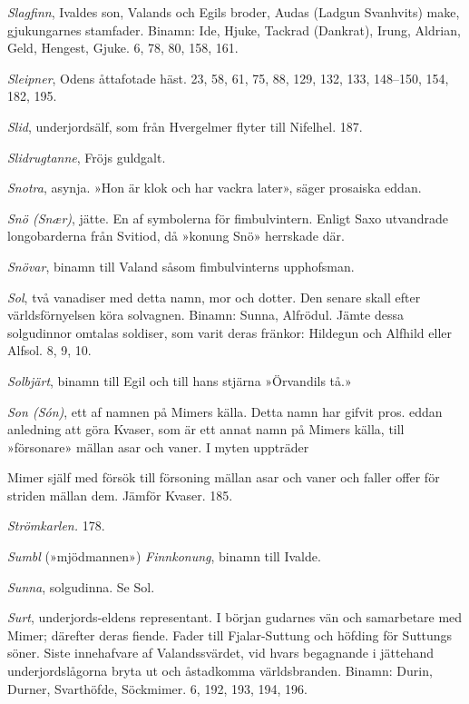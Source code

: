 \emph{Slagfinn}, Ivaldes son, Valands och Egils broder, Audas (Ladgun
Svanhvits) make, gjukungarnes stamfader. Binamn: Ide, Hjuke, Tackrad
(Dankrat), Irung, Aldrian, Geld, Hengest, Gjuke. 6, 78, 80, 158, 161.

\emph{Sleipner}, Odens åttafotade häst. 23, 58, 61, 75, 88, 129, 132,
133, 148--150, 154, 182, 195.

\emph{Slid}, underjordsälf, som från Hvergelmer flyter till Nifelhel.
187.

\emph{Slidrugtanne}, Fröjs guldgalt.

\emph{Snotra}, asynja. »Hon är klok och har vackra later», säger
prosaiska eddan.

\emph{Snö (Snær)}, jätte. En af symbolerna för fimbulvintern. Enligt
Saxo utvandrade longobarderna från Svitiod, då »konung Snö» herrskade
där.

\emph{Snövar}, binamn till Valand såsom fimbulvinterns upphofsman.

\emph{Sol}, två vanadiser med detta namn, mor och dotter. Den senare
skall efter världsförnyelsen köra solvagnen. Binamn: Sunna, Alfrödul.
Jämte dessa solgudinnor omtalas soldiser, som varit deras fränkor:
Hildegun och Alfhild eller Alfsol. 8, 9, 10.

\emph{Solbjärt}, binamn till Egil och till hans stjärna »Örvandils tå.»

\emph{Son (Són)}, ett af namnen på Mimers källa. Detta namn har gifvit
pros. eddan anledning att göra Kvaser, som är ett annat namn på Mimers
källa, till »försonare» mällan asar och vaner. I myten uppträder

\protect\hypertarget{lb1625905.xhtmlux5cux23start239}{}{}\protect\hypertarget{lb1625905.xhtmlux5cux23start239-a}{}{}\protect\hypertarget{lb1625905.xhtmlux5cux23start239-b}{}{}\protect\hypertarget{lb1625905.xhtmlux5cux23start239-c}{}{}\protect\hypertarget{lb1625905.xhtmlux5cux23start239-d}{}{}

Mimer själf med försök till försoning mällan asar och vaner och faller
offer för striden mällan dem. Jämför Kvaser. 185.

\emph{Strömkarlen.} 178.

\emph{Sumbl} (»mjödmannen») \emph{Finnkonung}, binamn till Ivalde.

\emph{Sunna}, solgudinna. Se Sol.

\emph{Surt}, underjords-eldens representant. I början gudarnes vän och
samarbetare med Mimer; därefter deras fiende. Fader till Fjalar-Suttung
och höfding för Suttungs söner. Siste innehafvare af Valandssvärdet, vid
hvars begagnande i jättehand underjordslågorna bryta ut och åstadkomma
världsbranden. Binamn: Durin, Durner, Svarthöfde, Söckmimer. 6, 192,
193, 194, 196.

